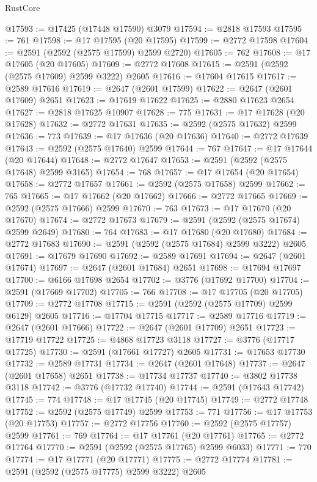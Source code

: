 \begin{lexlean}{RustCore}
\begin{coremodule}
@17593 := @17425 (@17448 @17590) @3079
@17594 := @2818 @17593
@17595 := 761
@17598 := @17 @17595 (@20 @17595)
@17599 := @2772 @17598
@17604 := @2591 (@2592 (@2575 @17599) @2599 @2720)
@17605 := 762
@17608 := @17 @17605 (@20 @17605)
@17609 := @2772 @17608
@17615 := @2591 (@2592 (@2575 @17609) @2599 @3222) @2605
@17616 := @17604 @17615
@17617 := @2589 @17616
@17619 := @2647 (@2601 @17599)
@17622 := @2647 (@2601 @17609) @2651
@17623 := @17619 @17622
@17625 := @2880 @17623 @2654
@17627 := @2818 @17625 @10907
@17628 := 775
@17631 := @17 @17628 (@20 @17628)
@17632 := @2772 @17631
@17635 := @2592 (@2575 @17632) @2599
@17636 := 773
@17639 := @17 @17636 (@20 @17636)
@17640 := @2772 @17639
@17643 := @2592 (@2575 @17640) @2599
@17644 := 767
@17647 := @17 @17644 (@20 @17644)
@17648 := @2772 @17647
@17653 := @2591 (@2592 (@2575 @17648) @2599 @3165)
@17654 := 768
@17657 := @17 @17654 (@20 @17654)
@17658 := @2772 @17657
@17661 := @2592 (@2575 @17658) @2599
@17662 := 765
@17665 := @17 @17662 (@20 @17662)
@17666 := @2772 @17665
@17669 := @2592 (@2575 @17666) @2599
@17670 := 763
@17673 := @17 @17670 (@20 @17670)
@17674 := @2772 @17673
@17679 := @2591 (@2592 (@2575 @17674) @2599 @2649)
@17680 := 764
@17683 := @17 @17680 (@20 @17680)
@17684 := @2772 @17683
@17690 := @2591 (@2592 (@2575 @17684) @2599 @3222) @2605
@17691 := @17679 @17690
@17692 := @2589 @17691
@17694 := @2647 (@2601 @17674)
@17697 := @2647 (@2601 @17684) @2651
@17698 := @17694 @17697
@17700 := @6166 @17698 @2654
@17702 := @3776 (@17692 @17700)
@17704 := @2591 (@17669 @17702)
@17705 := 766
@17708 := @17 @17705 (@20 @17705)
@17709 := @2772 @17708
@17715 := @2591 (@2592 (@2575 @17709) @2599 @6129) @2605
@17716 := @17704 @17715
@17717 := @2589 @17716
@17719 := @2647 (@2601 @17666)
@17722 := @2647 (@2601 @17709) @2651
@17723 := @17719 @17722
@17725 := @4868 @17723 @3118
@17727 := @3776 (@17717 @17725)
@17730 := @2591 (@17661 @17727) @2605
@17731 := @17653 @17730
@17732 := @2589 @17731
@17734 := @2647 (@2601 @17648)
@17737 := @2647 (@2601 @17658) @2651
@17738 := @17734 @17737
@17740 := @3802 @17738 @3118
@17742 := @3776 (@17732 @17740)
@17744 := @2591 (@17643 @17742)
@17745 := 774
@17748 := @17 @17745 (@20 @17745)
@17749 := @2772 @17748
@17752 := @2592 (@2575 @17749) @2599
@17753 := 771
@17756 := @17 @17753 (@20 @17753)
@17757 := @2772 @17756
@17760 := @2592 (@2575 @17757) @2599
@17761 := 769
@17764 := @17 @17761 (@20 @17761)
@17765 := @2772 @17764
@17770 := @2591 (@2592 (@2575 @17765) @2599 @6033)
@17771 := 770
@17774 := @17 @17771 (@20 @17771)
@17775 := @2772 @17774
@17781 := @2591 (@2592 (@2575 @17775) @2599 @3222) @2605

\end{coremodule}
\end{lexlean}
